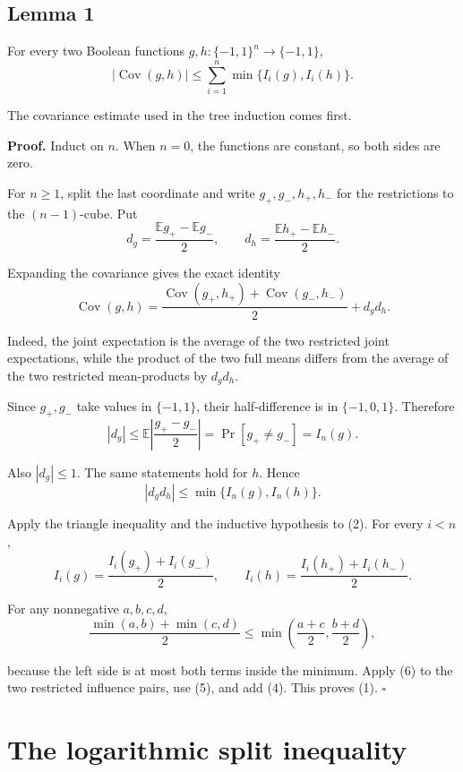 \documentclass[
  american,
  11pt,
]{article}
\begin{document}
\subsection*{Lemma 1}\label{lemma-1}

For every two Boolean functions \(g,h:\{-1,1\}^n\to\{-1,1\}\), \[
|\operatorname{Cov}(g,h)|\leq
\sum_{i=1}^n\min\{I_i(g),I_i(h)\}.
\tag{1}
\]

The covariance estimate used in the tree induction comes first.

\textbf{Proof.} Induct on \(n\). When \(n=0\), the functions are
constant, so both sides are zero.

For \(n\geq1\), split the last coordinate and write \(g_+,g_-,h_+,h_-\)
for the restrictions to the \((n-1)\)-cube. Put \[
d_g=\frac{\mathbb E g_+-\mathbb E g_-}{2},
\qquad
d_h=\frac{\mathbb E h_+-\mathbb E h_-}{2}.
\]

Expanding the covariance gives the exact identity \[
\operatorname{Cov}(g,h)
=\frac{\operatorname{Cov}(g_+,h_+)+\operatorname{Cov}(g_-,h_-)}2+d_gd_h.
\tag{2}
\]

Indeed, the joint expectation is the average of the two restricted joint
expectations, while the product of the two full means differs from the
average of the two restricted mean-products by \(d_gd_h\).

Since \(g_+,g_-\) take values in \(\{-1,1\}\), their half-difference is
in \(\{-1,0,1\}\). Therefore \[
|d_g|
\leq\mathbb E\left|\frac{g_+-g_-}{2}\right|
=\Pr[g_+\ne g_-]
=I_n(g).
\tag{3}
\]

Also \(|d_g|\leq1\). The same statements hold for \(h\). Hence \[
|d_gd_h|\leq\min\{I_n(g),I_n(h)\}.
\tag{4}
\]

Apply the triangle inequality and the inductive hypothesis to (2). For
every \(i<n\), \[
I_i(g)=\frac{I_i(g_+)+I_i(g_-)}2,
\qquad
I_i(h)=\frac{I_i(h_+)+I_i(h_-)}2.
\tag{5}
\]

For any nonnegative \(a,b,c,d\), \[
\frac{\min(a,b)+\min(c,d)}2
\leq\min\left(\frac{a+c}2,\frac{b+d}2\right),
\tag{6}
\]

because the left side is at most both terms inside the minimum. Apply
(6) to the two restricted influence pairs, use (5), and add (4). This
proves (1). \(\square\)

\section{The logarithmic split
inequality}\label{the-logarithmic-split-inequality}
\end{document}
